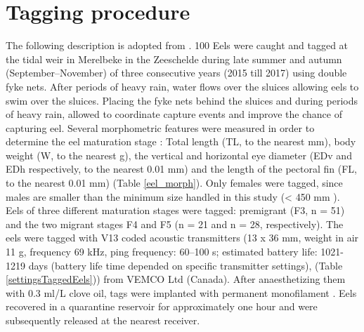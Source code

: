 \appendix

\section{Tagging procedure}
\label{Taggingprocedure}

The following description is adopted from \citet{Verhelst2018}. 100 Eels were caught and tagged at the tidal weir in Merelbeke in the Zeeschelde during late summer and autumn (September–November) of three consecutive years (2015 till 2017) using double fyke nets. After periods of heavy rain, water flows over the sluices allowing eels to swim over the sluices. Placing the fyke nets behind the sluices and during periods of heavy rain, allowed to coordinate capture events and improve the chance of capturing eel. Several morphometric features were measured in order to determine the eel maturation stage \citep{Durif2005}: Total length (TL, to the nearest mm), body weight (W, to the nearest g), the vertical and horizontal eye diameter (EDv and EDh respectively, to the nearest 0.01 mm) and the length of the pectoral fin (FL, to the nearest 0.01 mm) (Table \ref{eel_morph}). Only females were tagged, since males are smaller than the minimum size handled in this study (< 450 mm \citep{Durif2005}). Eels of three different maturation stages were tagged: premigrant (F3, n = 51) and the two migrant stages F4 and F5 (n = 21 and n = 28, respectively). The eels were tagged with V13 coded acoustic transmitters (13 x 36 mm, weight in air 11 g, frequency 69 kHz, ping frequency: 60–100 s; estimated battery life: 1021-1219 days (battery life time depended on specific transmitter settings), (Table \ref{settingsTaggedEels})) from VEMCO Ltd (Canada). After anaesthetizing them with 0.3 ml/L clove oil, tags were implanted with permanent monofilament \citep{Thorstad2013b}. Eels recovered in a quarantine reservoir for approximately one hour and were subsequently released at the nearest receiver. 

\setcounter{table}{0} \renewcommand{\thetable}{A.\arabic{table}}

